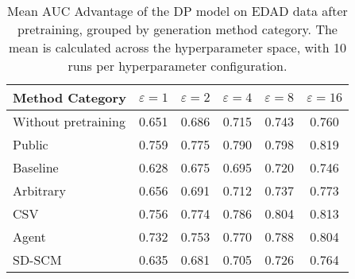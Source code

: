 \begin{table}[h!]
    \centering
    \caption{Mean AUC Advantage of the DP model on EDAD data after pretraining, grouped by generation method category. The mean is calculated across the hyperparameter space, with 10 runs per hyperparameter configuration.}
    \label{tab:epsilon_comparison}
    \begin{tabular}{lccccc}
    \toprule
    Method Category & $\varepsilon=1$ & $\varepsilon=2$ & $\varepsilon=4$ & $\varepsilon=8$ & $\varepsilon=16$ \\
    \midrule
    Without pretraining & 0.651 & 0.686 & 0.715 & 0.743 & 0.760 \\
    \arrayrulecolor{black!50!}\midrule
    Public & \cellcolor{gold!30}0.759 & \cellcolor{gold!30}0.775 & \cellcolor{gold!30}0.790 & \cellcolor{silver!30}0.798 & \cellcolor{gold!30}0.819 \\
    \arrayrulecolor{black!50!}\midrule
    Baseline & 0.628 & 0.675 & 0.695 & 0.720 & 0.746 \\
    \arrayrulecolor{black!50!}\midrule
    Arbitrary & 0.656 & 0.691 & 0.712 & 0.737 & 0.773 \\
    \arrayrulecolor{black!50!}\midrule
    CSV & \cellcolor{silver!30}0.756 & \cellcolor{silver!30}0.774 & \cellcolor{silver!30}0.786 & \cellcolor{gold!30}0.804 & \cellcolor{silver!30}0.813 \\
    Agent & \cellcolor{bronze!30}0.732 & \cellcolor{bronze!30}0.753 & \cellcolor{bronze!30}0.770 & \cellcolor{bronze!30}0.788 & \cellcolor{bronze!30}0.804 \\
    SD-SCM & 0.635 & 0.681 & 0.705 & 0.726 & 0.764 \\
    \bottomrule
    \end{tabular}
\end{table}